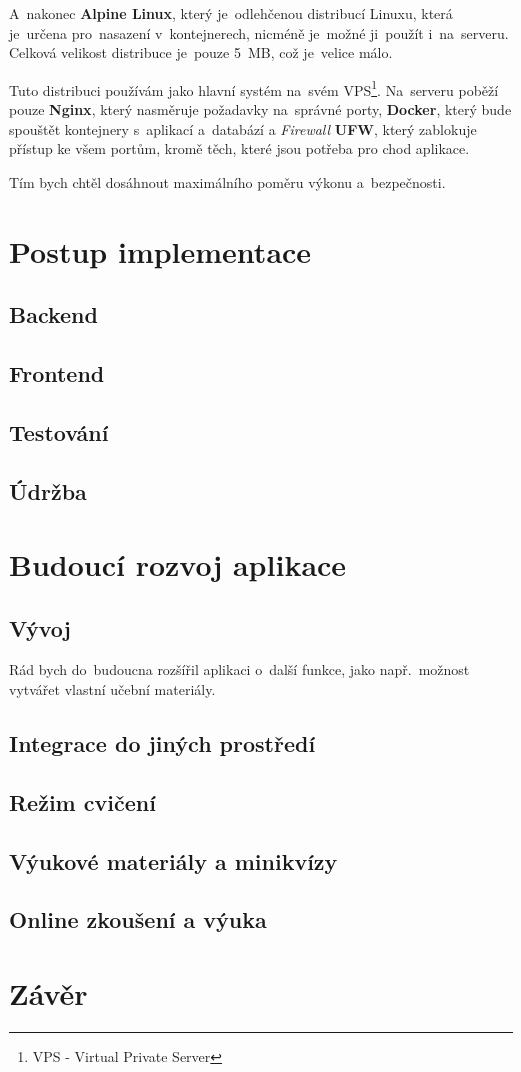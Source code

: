 \documentclass[14pt,a4paper]{article}
\begin{document}
            A~nakonec \textbf{Alpine Linux}, který je~odlehčenou distribucí Linuxu, která je~určena pro~nasazení v~kontejnerech,
            nicméně je~možné ji~použít i~na~serveru. Celková velikost distribuce je~pouze 5~MB, což je~velice málo.

            Tuto distribuci používám jako hlavní systém na~svém VPS\footnote{VPS - Virtual Private Server}.
            Na~serveru poběží pouze \textbf{Nginx}, který nasměruje požadavky na~správné porty,
            \textbf{Docker}, který bude spouštět kontejnery s~aplikací a~databází a \emph{Firewall} \textbf{UFW}, který zablokuje přístup ke všem portům,
            kromě těch, které jsou potřeba pro chod aplikace.

            Tím bych chtěl dosáhnout maximálního poměru výkonu a~bezpečnosti.
	
	\section{Postup implementace}
        \subsection{Backend}
        \subsection{Frontend}
        \subsection{Testování}
        \subsection{Údržba}
        
	\section{Budoucí rozvoj aplikace}
        \subsection{Vývoj}
        Rád bych do~budoucna rozšířil aplikaci o~další funkce, jako např.~možnost vytvářet vlastní učební materiály.

        \subsection{Integrace do jiných prostředí}
        \subsection{Režim cvičení}
        \subsection{Výukové materiály a minikvízy}
        \subsection{Online zkoušení a výuka}
	
	\section{Závěr}

\printbibliography
\end{document}
